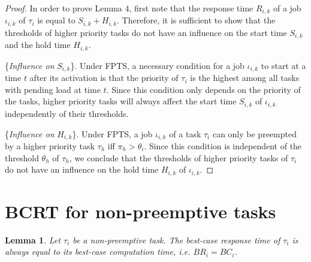 \documentclass[fleqn]{article}
\newtheorem{lemma}{Lemma}
\begin{document}
\begin{proof}
	In order to prove Lemma 4, first note that the response time $R_{i,k}$ of a job $\iota_{i,k}$ of $\tau_i$ is equal to $S_{i,k}+H_{i,k}$. Therefore, it is sufficient to show that the thresholds of higher priority tasks do not have an influence on the start time $S_{i,k}$ and the hold time $H_{i,k}$.
	
	\{\textit{Influence on} $S_{i,k}$\}. Under FPTS, a necessary condition for a job $\iota_{i,k}$ to start at a time $t$ after its activation is that the priority of $\tau_i$ is the highest among all tasks with pending load at time $t$. Since this condition only depends on the priority of the tasks, higher priority tasks will always affect the start time $S_{i,k}$ of $\iota_{i,k}$ independently of their thresholds.
	
	\{\textit{Influence on} $H_{i,k}$\}. Under FPTS, a job $\iota_{i,k}$ of a task $\tau_i$ can only be preempted by a higher priority task $\tau_h$ iff $\pi_h > \theta_i$. Since this condition is independent of the threshold $\theta_h$ of $\tau_h$, we conclude that the thresholds of higher priority tasks of $\tau_i$ do not have an influence on the hold time $H_{i,k}$ of $\iota_{i,k}$.
\end{proof}

\section{BCRT for non-preemptive tasks}

\begin{lemma}
	Let $\tau_i$ be a non-preemptive task. The \textit{best-case response time} of $\tau_i$ is always equal to its \textit{best-case computation time}, i.e. $BR_i = BC_i$.
\end{lemma}
\end{document}
